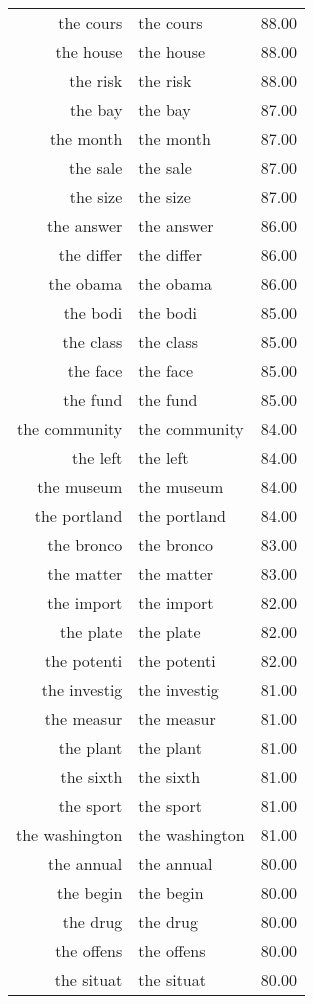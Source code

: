 \begin{table}[ht]
\begin{tabular}{rlr}
  the cours & the cours & 88.00 \\ 
  the house & the house & 88.00 \\ 
  the risk & the risk & 88.00 \\ 
  the bay & the bay & 87.00 \\ 
  the month & the month & 87.00 \\ 
  the sale & the sale & 87.00 \\ 
  the size & the size & 87.00 \\ 
  the answer & the answer & 86.00 \\ 
  the differ & the differ & 86.00 \\ 
  the obama & the obama & 86.00 \\ 
  the bodi & the bodi & 85.00 \\ 
  the class & the class & 85.00 \\ 
  the face & the face & 85.00 \\ 
  the fund & the fund & 85.00 \\ 
  the community & the community & 84.00 \\ 
  the left & the left & 84.00 \\ 
  the museum & the museum & 84.00 \\ 
  the portland & the portland & 84.00 \\ 
  the bronco & the bronco & 83.00 \\ 
  the matter & the matter & 83.00 \\ 
  the import & the import & 82.00 \\ 
  the plate & the plate & 82.00 \\ 
  the potenti & the potenti & 82.00 \\ 
  the investig & the investig & 81.00 \\ 
  the measur & the measur & 81.00 \\ 
  the plant & the plant & 81.00 \\ 
  the sixth & the sixth & 81.00 \\ 
  the sport & the sport & 81.00 \\ 
  the washington & the washington & 81.00 \\ 
  the annual & the annual & 80.00 \\ 
  the begin & the begin & 80.00 \\ 
  the drug & the drug & 80.00 \\ 
  the offens & the offens & 80.00 \\ 
  the situat & the situat & 80.00 \\ 

\end{tabular}
\end{table}
